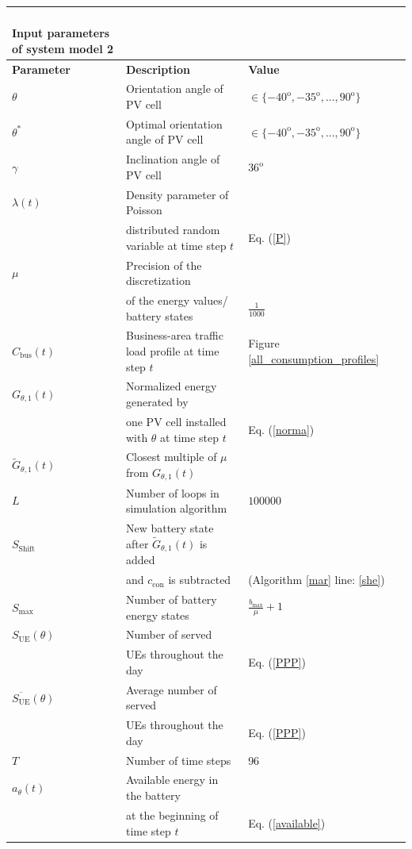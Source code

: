 \begin{longtable}{@{}l*{2}{|l}l@{}}
\caption{\\ Input parameters of system model 2\label{frog}}\\ \toprule
\textbf{Parameter}	&\textbf{Description}				&  \textbf{Value} \\ \midrule
$\theta$  & Orientation angle of PV cell&$\in \{-40^{\mathrm{o}},-35^{\mathrm{o}},...,90^{\mathrm{o}}\}$  \\
$\theta^*$  & Optimal orientation angle of PV cell&$\in \{-40^{\mathrm{o}},-35^{\mathrm{o}},...,90^{\mathrm{o}}\}$  \\
$\gamma$ & Inclination angle of PV cell& $36^{\mathrm{o}}$ \\
$\lambda(t)$ &Density parameter of Poisson &  \\
&distributed random variable at time step $t$& Eq. (\ref{P}) \\
$\mu$ & Precision of the discretization &  \\
 &of the energy values/ battery states& $\frac{1}{1000}$ \\
$C_{\mathrm{bus}}(t)$ & Business-area traffic load profile at time step $t$& Figure \ref{all_consumption_profiles}\\
$G_{\theta,1}(t)$ &Normalized energy generated by&\\
& one PV cell installed with $\theta$ at time step $t$&Eq. (\ref{norma})\\
$\tilde{G}_{\theta,1}(t)$ &Closest multiple of $\mu$ from $G_{\theta,1}(t)$&\\
$L$  &Number of loops in simulation algorithm&$100000$\\
$S_{\mathrm{Shift}}$  &New battery state after $\tilde{G}_{\theta,1}(t)$ is added 
&\\
 &and $c_{\mathrm{con}}$ is subtracted
&(Algorithm \ref{mar} line: \ref{she})\\
$S_{\max}$&Number of battery energy states& $\frac{b_{\max}}{\mu}+1$ \\
$S_{\mathrm{UE}}(\theta)$ &Number of served  &\\
 & UEs throughout the day &Eq. (\ref{PPP})\\
$\overline{S_{\mathrm{UE}}}(\theta)$ &Average number of served  &\\
 &UEs throughout the day &Eq. (\ref{PPP})\\
$T$ &Number of time steps&96\\
$a_\theta(t)$&Available energy in the battery &\\
&at the beginning of time step $t$&Eq. (\ref{available})\\

\end{longtable}
